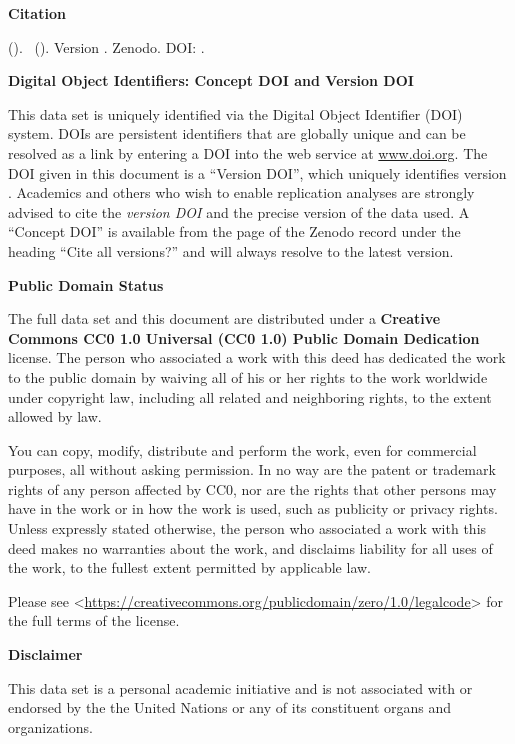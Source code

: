 \textbf{Citation}

\emph{\dataauthor} (\the\year ). \datatitle\ (\datashort ). Version \version . Zenodo. DOI: \dataversiondoi .

\vspace{0.5cm}

\textbf{Digital Object Identifiers: Concept DOI and Version DOI}

This data set is uniquely identified via the Digital Object Identifier (DOI) system. DOIs are persistent identifiers that are globally unique and can be resolved as a link by entering a DOI into the web service at \url{www.doi.org}. The DOI given in this document is a \enquote{Version DOI}, which uniquely identifies version \version. Academics and others who wish to enable replication analyses are strongly advised to cite the \emph{version DOI} and the precise version of the data used. A \enquote{Concept DOI} is available from the page of the Zenodo record under the heading \enquote{Cite all versions?} and will always resolve to the latest version.

\vspace{0.5cm}



\textbf{Public Domain Status}

The full data set and this document are distributed under a \textbf{Creative Commons CC0 1.0 Universal (CC0 1.0) Public Domain Dedication} license. The person who associated a work with this deed has dedicated the work to the public domain by waiving all of his or her rights to the work worldwide under copyright law, including all related and neighboring rights, to the extent allowed by law.

You can copy, modify, distribute and perform the work, even for commercial purposes, all without asking permission. In no way are the patent or trademark rights of any person affected by CC0, nor are the rights that other persons may have in the work or in how the work is used, such as publicity or privacy rights. Unless expressly stated otherwise, the person who associated a work with this deed makes no warranties about the work, and disclaims liability for all uses of the work, to the fullest extent permitted by applicable law. 

Please see <\url{https://creativecommons.org/publicdomain/zero/1.0/legalcode}> for the full terms of the license.


\vspace{0.5cm}

\textbf{Disclaimer} 

This data set is a personal academic initiative and is not associated with or endorsed by the the United Nations or any of its constituent organs and organizations.


\newpage